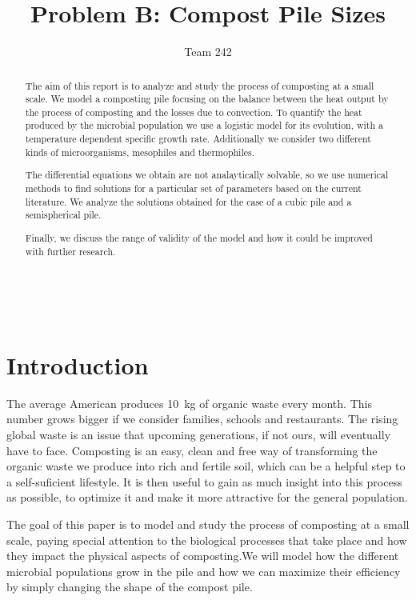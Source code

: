 \documentclass[12pt, a4paper, twocolumn, twoside]{article}
\title{\sffamily \bfseries Problem B: Compost Pile Sizes}
\author{\sffamily Team 242}
\date{}
\numberwithin{table}{section}
\numberwithin{figure}{section}
\numberwithin{equation}{section}
\begin{document}
\renewcommand{\abstractname}{}
\renewcommand{\absnamepos}{empty}
\begin{titlingpage}
 	\maketitle

\noindent \hrulefill \\
\begin{abstract}
\sffamily
The aim of this report is to analyze and study the process of composting at a small scale. We model a composting pile focusing on the balance between the heat output by the process of composting and the losses due to convection. To quantify the heat produced by the microbial population we use a logistic model for its evolution, with a temperature dependent specific growth rate. Additionally we consider two different kinds of microorganisms, mesophiles and thermophiles. 

The differential equations we obtain are not analaytically solvable, so we use numerical methods to find solutions for a particular set of parameters based on the current literature. We analyze the solutions obtained for the case of a cubic pile and a semispherical pile.    

Finally, we discuss the range of validity of the model and how it could be improved with further research.
\end{abstract}
\hrulefill
\end{titlingpage}

\begin{titlingpage}
	\sffamily
	\tableofcontents
\end{titlingpage}

\section{Introduction}
The average American produces \SI{10}{kg} of organic waste every month. This number grows bigger if we consider families, schools and restaurants. The rising global waste is an issue that upcoming generations, if not ours, will eventually have to face. Composting is an easy, clean and free way of transforming the organic waste we produce into rich and fertile soil, which can be a helpful step to a self-suficient lifestyle. It is then useful to gain as much insight into this process as possible, to optimize it and make it more attractive for the general population. 

The goal of this paper is to model and study the process of composting at a small scale, paying special attention to the biological processes that take place and how they impact the physical aspects of composting.We will model how the different microbial populations grow in the pile and how we can maximize their efficiency by simply changing the shape of the compost pile. 
\end{document}
